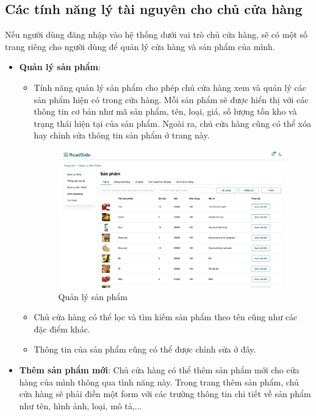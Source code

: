 \subsection{Các tính năng lý tài nguyên cho chủ cửa hàng}
Nếu người dùng đăng nhập vào hệ thống dưới vai trò chủ cửa hàng, sẽ có một số trang riêng cho người dùng để quản lý cửa hàng và sản phẩm của mình.
\begin{itemize}
    \item \textbf{Quản lý sản phẩm}: 
    \begin{itemize}
        \item Tính năng quản lý sản phẩm cho phép chủ cửa hàng xem và quản lý các sản phẩm hiện có trong cửa hàng. Mỗi sản phẩm sẽ được hiển thị với các thông tin cơ bản như mã sản phẩm, tên, loại, giá, số lượng tồn kho và trạng thái hiện tại của sản phẩm. Ngoài ra, chủ cửa hàng cũng có thể xóa hay chỉnh sửa thông tin sản phẩm ở trang này.
        \begin{figure}[H]
            \begin{center}
            \includegraphics[width=0.95\linewidth] {Images/UI/shop_products.png}
            \end{center}
            \caption{Quản lý sản phẩm}
        \end{figure}
        \item Chủ cửa hàng có thể lọc và tìm kiếm sản phẩm theo tên cũng như các đặc điểm khác.
        \item Thông tin của sản phẩm cũng có thể được chỉnh sửa ở đây.
    \end{itemize}
    \item \textbf{Thêm sản phẩm mới}: Chủ cửa hàng có thể thêm sản phẩm mới cho cửa hàng của mình thông qua tình năng này. Trong trang thêm sản phẩm, chủ cửa hàng sẽ phải điền một form với các trường thông tin chi tiết về sản phẩm như tên, hình ảnh, loại, mô tả,... 

\end{itemize}
